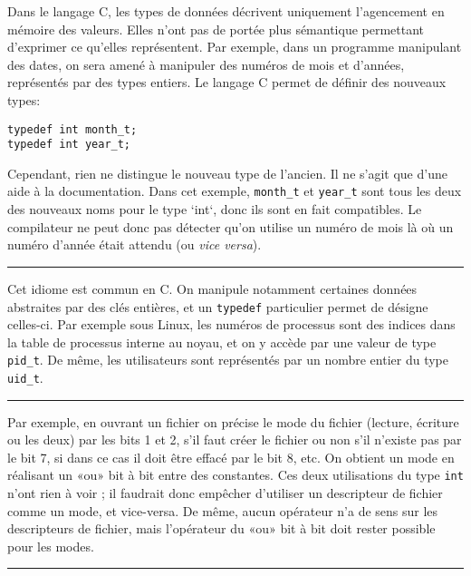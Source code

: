 Dans le langage C, les types de données décrivent uniquement l'agencement en
mémoire des valeurs. Elles n'ont pas de portée plus sémantique permettant
d'exprimer ce qu'elles représentent. Par exemple, dans un programme manipulant
des dates, on sera amené à manipuler des numéros de mois et d'années,
représentés par des types entiers. Le langage C permet de définir des nouveaux
types:

\begin{verbatim}
typedef int month_t;
typedef int year_t;
\end{verbatim}

Cependant, rien ne distingue le nouveau type de l'ancien. Il ne s'agit que d'une
aide à la documentation. Dans cet exemple, \texttt{month\_t} et \texttt{year\_t}
sont tous les deux des nouveaux noms pour le type `int`, donc ils sont en fait
compatibles. Le compilateur ne peut donc pas détecter qu'on utilise un numéro de
mois là où un numéro d'année était attendu (ou \emph{vice versa}).

\begin{center}\rule{3in}{0.4pt}\end{center}

Cet idiome est commun en C. On manipule notamment certaines données abstraites
par des clés entières, et un \texttt{typedef} particulier permet de désigne
celles-ci. Par exemple sous Linux, les numéros de processus sont des indices
dans la table de processus interne au noyau, et on y accède par une valeur de
type \texttt{pid\_t}. De même, les utilisateurs sont représentés par un nombre
entier du type \texttt{uid\_t}.

\begin{center}\rule{3in}{0.4pt}\end{center}

\def\tBits{\textsc{Bits}\xspace}

Par exemple, en ouvrant un fichier on précise le mode du fichier (lecture,
écriture ou les deux) par les bits 1 et 2, s'il faut créer le fichier ou non
s'il n'existe pas par le bit 7, si dans ce cas il doit être effacé par le bit 8,
etc. On obtient un mode en réalisant un «ou» bit à bit entre des constantes. Ces
deux utilisations du type \texttt{int} n'ont rien à voir ; il faudrait donc
empêcher d'utiliser un descripteur de fichier comme un mode, et vice-versa. De
même, aucun opérateur n'a de sens sur les descripteurs de fichier, mais
l'opérateur \texttt{\textbar{}} du «ou» bit à bit doit rester possible pour les
modes.

\begin{center}\rule{3in}{0.4pt}\end{center}

